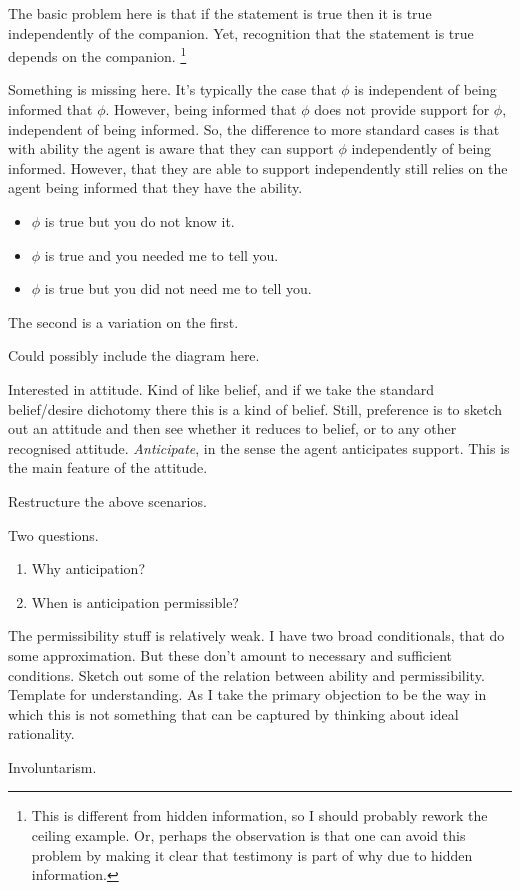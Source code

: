 \documentclass[10pt]{article}
\begin{document}
The basic problem here is that if the statement is true then it is true independently of the companion.
Yet, recognition that the statement is true depends on the companion.\nolinebreak
\footnote{
  This is different from hidden information, so I should probably rework the ceiling example.
  Or, perhaps the observation is that one can avoid this problem by making it clear that testimony is part of why due to hidden information.
}

{
  \color{red}
  Something is missing here.
  It's typically the case that \(\phi\) is independent of being informed that \(\phi\).
  However, being informed that \(\phi\) does not provide support for \(\phi\), independent of being informed.
  So, the difference to more standard cases is that with ability the agent is aware that they can support \(\phi\) independently of being informed.
  However, that they are able to support independently still relies on the agent being informed that they have the ability.

  \begin{itemize}
  \item \(\phi\) is true but you do not know it.
  \item \(\phi\) is true and you needed me to tell you.
  \item \(\phi\) is true but you did not need me to tell you.
  \end{itemize}
  The second is a variation on the first.
}

{
  \color{red}
  Could possibly include the diagram here.
}


{
  \color{red}
  Interested in attitude.
  Kind of like belief, and if we take the standard belief/desire dichotomy there this is a kind of belief.
  Still, preference is to sketch out an attitude and then see whether it reduces to belief, or to any other recognised attitude.
  \emph{Anticipate}, in the sense the agent anticipates support.
  This is the main feature of the attitude.

  Restructure the above scenarios.
}

Two questions.
\begin{enumerate}
\item Why anticipation?
\item When is anticipation permissible?
\end{enumerate}

{
  \color{red}
  The permissibility stuff is relatively weak.
  I have two broad conditionals, that do some approximation.
  But these don't amount to necessary and sufficient conditions.
  Sketch out some of the relation between ability and permissibility.
  Template for understanding.
  As I take the primary objection to be the way in which this is not something that can be captured by thinking about ideal rationality.

  Involuntarism.
}
\end{document}
